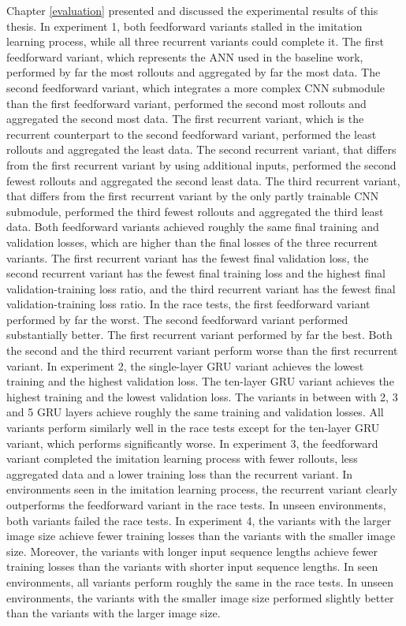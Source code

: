 Chapter \ref{evaluation} presented and discussed the experimental results of this thesis. 
In experiment 1, both feedforward variants stalled in the imitation learning process, while all three recurrent variants could complete it. The first feedforward variant, which represents the ANN used in the baseline work, performed by far the most rollouts and aggregated by far the most data. The second feedforward variant, which integrates a more complex CNN submodule than the first feedforward variant, performed the second most rollouts and aggregated the second most data. The first recurrent variant, which is the recurrent counterpart to the second feedforward variant, performed the least rollouts and aggregated the least data. The second recurrent variant, that differs from the first recurrent variant by using additional inputs, performed the second fewest rollouts and aggregated the second least data. The third recurrent variant, that differs from the first recurrent variant by the only partly trainable CNN submodule, performed the third fewest rollouts and aggregated the third least data. Both feedforward variants achieved roughly the same final training and validation losses, which are higher than the final losses of the three recurrent variants. The first recurrent variant has the fewest final validation loss, the second recurrent variant has the fewest final training loss and the highest final validation-training loss ratio, and the third recurrent variant has the fewest final validation-training loss ratio. In the race tests, the first feedforward variant performed by far the worst. The second feedforward variant performed substantially better. The first recurrent variant performed by far the best. Both the second and the third recurrent variant perform worse than the first recurrent variant.
In experiment 2, the single-layer GRU variant achieves the lowest training and the highest validation loss. The ten-layer GRU variant achieves the highest training and the lowest validation loss. The variants in between with 2, 3 and 5 GRU layers achieve roughly the same training and validation losses. All variants perform similarly well in the race tests except for the ten-layer GRU variant, which performs significantly worse. 
In experiment 3, the feedforward variant completed the imitation learning process with fewer rollouts, less aggregated data and a lower training loss than the recurrent variant. In environments seen in the imitation learning process, the recurrent variant clearly outperforms the feedforward variant in the race tests. In unseen environments, both variants failed the race tests. 
In experiment 4, the variants with the larger image size achieve fewer training losses than the variants with the smaller image size. Moreover, the variants with longer input sequence lengths achieve fewer training losses than the variants with shorter input sequence lengths. In seen environments, all variants perform roughly the same in the race tests. In unseen environments, the variants with the smaller image size performed slightly better than the variants with the larger image size.











